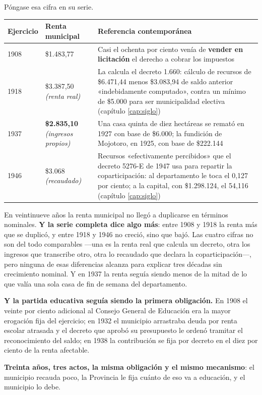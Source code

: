 Póngase esa cifra en su serie.

{\small
\begin{longtable}{@{}p{2.2cm}p{4.0cm}p{6.4cm}@{}}
\toprule
\textbf{Ejercicio} & \textbf{Renta municipal} & \textbf{Referencia contemporánea} \\
\midrule
\endhead
1908 & \$1.483,77 & Casi el ochenta por ciento venía de \textbf{vender en licitación} el derecho a cobrar los impuestos \\
1918 & \$3.387,50 \textit{(renta real)} & La calcula el decreto 1.660: cálculo de recursos de \$6.471,44 menos \$3.083,94 de saldo anterior «indebidamente computado», contra un mínimo de \$5.000 para ser municipalidad electiva (capítulo \ref{cap:siglo}) \\
1937 & \textbf{\$2.835,10} \textit{(ingresos propios)} & Una casa quinta de diez hectáreas se remató en 1927 con base de \$6.000; la fundición de Mojotoro, en 1925, con base de \$222.144 \\
1946 & \$3.068 \textit{(recaudado)} & Recursos «efectivamente percibidos» que el decreto 5276-E de 1947 usa para repartir la coparticipación: al departamento le toca el 0,127 por ciento; a la capital, con \$1.298.124, el 54,116 (capítulo \ref{cap:siglo}) \\
\bottomrule
\end{longtable}}

En veintinueve años la renta municipal no llegó a duplicarse en términos nominales. \textbf{Y
la serie completa dice algo más}: entre 1908 y 1918 la renta más que se duplicó, y entre 1918 y
1946 no creció, sino que bajó. Las cuatro cifras no son del todo comparables ---una es la renta
real que calcula un decreto, otra los ingresos que transcribe otro, otra lo recaudado que declara la
coparticipación---, pero ninguna de esas diferencias alcanza para explicar tres décadas sin
crecimiento nominal. Y en 1937 la renta seguía
siendo menos de la mitad de lo que valía una sola casa de fin de semana del departamento.

\textbf{Y la partida educativa seguía siendo la primera obligación.} En 1908 el veinte por
ciento adicional al Consejo General de Educación era la mayor erogación fija del ejercicio;
en 1932 el municipio arrastraba deuda por renta escolar atrasada y el decreto que aprobó su
presupuesto le ordenó tramitar el reconocimiento del saldo; en 1938 la contribución se fija
por decreto en el diez por ciento de la renta afectable.

\textbf{Treinta años, tres actos, la misma obligación y el mismo mecanismo}: el municipio
recauda poco, la Provincia le fija cuánto de eso va a educación, y el municipio lo debe.

